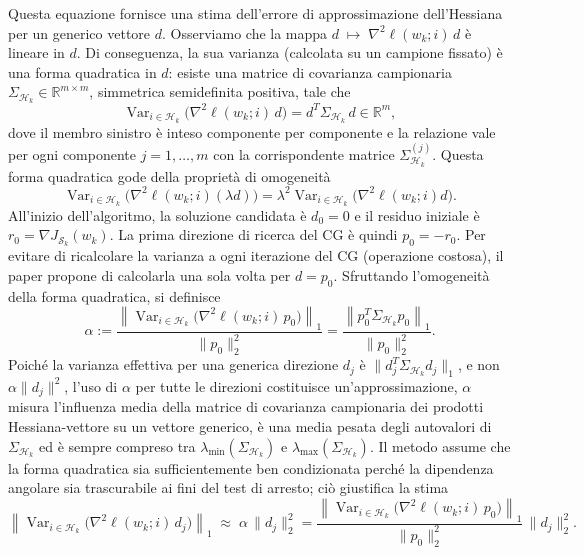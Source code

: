 \documentclass[a4paper,12pt]{article}
\begin{document}
Questa equazione fornisce una stima dell'errore di approssimazione dell'Hessiana per un generico vettore $d$.
Osserviamo che la mappa 
$d \;\longmapsto\; \nabla^2\ell(w_k;i)\,d$
è lineare in $d$. Di conseguenza, la sua varianza (calcolata su un campione fissato) è una forma quadratica in $d$: esiste una matrice di covarianza campionaria $\Sigma_{\mathcal{H}_k} \in \mathbb{R}^{m\times m}$, simmetrica semidefinita positiva, tale che
\[
\operatorname{Var}_{i\in\mathcal{H}_k}\bigl(\nabla^2\ell(w_k;i)\,d\bigr)
= d^T \Sigma_{\mathcal{H}_k}\, d \in \mathbb{R}^m,
\]
dove il membro sinistro è inteso componente per componente e la relazione vale per ogni componente $j=1,\dots,m$ con la corrispondente matrice $\Sigma_{\mathcal{H}_k}^{(j)}$. Questa forma quadratica gode della proprietà di omogeneità
\[
\operatorname{Var}_{i\in\mathcal{H}_k}\bigl(\nabla^2\ell(w_k;i)(\lambda d)\bigr)
= \lambda^2 \operatorname{Var}_{i\in\mathcal{H}_k}\bigl(\nabla^2\ell(w_k;i)d\bigr).
\]
\medskip
\noindent
All'inizio dell'algoritmo, la soluzione candidata è $d_0 = 0$ e il residuo iniziale è $r_0 = \nabla J_{\mathcal{S}_k}(w_k)$. La prima direzione di ricerca del CG è quindi $p_0 = -r_0$. 
Per evitare di ricalcolare la varianza a ogni iterazione del CG (operazione costosa), il paper propone di calcolarla una sola volta per $d = p_0$. Sfruttando l'omogeneità della forma quadratica, si definisce
\[
\alpha := \frac{\left\| \operatorname{Var}_{i\in\mathcal{H}_k}\bigl(\nabla^2\ell(w_k;i)\,p_0\bigr) \right\|_1}{\|p_0\|_2^2}
= \frac{\left\| p_0^T \Sigma_{\mathcal{H}_k} p_0 \right\|_1}{\|p_0\|_2^2}.
\tag{4.6}
\]
Poiché la varianza effettiva per una generica direzione $d_j$ è $\|d_j^T \Sigma_{\mathcal{H}_k} d_j\|_1$, e non $\alpha\|d_j\|^2$, l'uso di $\alpha$ per tutte le direzioni costituisce un'approssimazione, $\alpha$ misura l'influenza media della matrice di covarianza campionaria dei prodotti Hessiana-vettore su un vettore generico, è una media pesata degli autovalori di $\Sigma_{\mathcal{H}_k}$ ed è sempre compreso tra $\lambda_{\min}(\Sigma_{\mathcal{H}_k})$ e $\lambda_{\max}(\Sigma_{\mathcal{H}_k})$. Il metodo assume che la forma quadratica sia sufficientemente ben condizionata perché la dipendenza angolare sia trascurabile ai fini del test di arresto; ciò giustifica la stima
\[\left\| \operatorname{Var}_{i\in\mathcal{H}_k}\bigl(\nabla^2\ell(w_k;i)\,d_j\bigr) \right\|_1
\;\approx\;
\alpha \, \|d_j\|_2^2
=
\frac{\left\| \operatorname{Var}_{i\in\mathcal{H}_k}\bigl(\nabla^2\ell(w_k;i)\,p_0\bigr) \right\|_1}{\|p_0\|_2^2} \, \|d_j\|_2^2.
\tag{4.7}
\]
\end{document}
